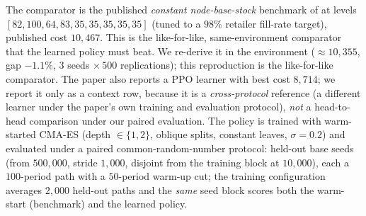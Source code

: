 \documentclass[11pt]{article}
\begin{document}
The comparator is the published \emph{constant node-base-stock} benchmark of
\citet{geevers2024cardboard} at levels $[82,100,64,83,35,35,35,35,35]$ (tuned to a $98\%$ retailer
fill-rate target), published cost $10{,}467$. This is the like-for-like, same-environment comparator
that the learned policy must beat. We re-derive it in the environment ($\approx 10{,}355$, gap
$-1.1\%$, $3$ seeds $\times\,500$ replications); this reproduction is the like-for-like comparator. The paper
also reports a PPO learner with best cost $8{,}714$; we report it only as a context row, because it is
a \emph{cross-protocol} reference (a different learner under the paper's own training and evaluation
protocol), \emph{not} a head-to-head comparison under our paired evaluation. The policy is trained with
warm-started CMA-ES (depth $\in\{1,2\}$, oblique splits, constant leaves, $\sigma=0.2$) and evaluated
under a paired common-random-number protocol: held-out base seeds (from $500{,}000$, stride $1{,}000$,
disjoint from the training block at $10{,}000$), each a $100$-period path with a $50$-period warm-up
cut; the training configuration averages $2{,}000$ held-out paths and the \emph{same} seed block scores both the
warm-start (benchmark) and the learned policy.
\end{document}
